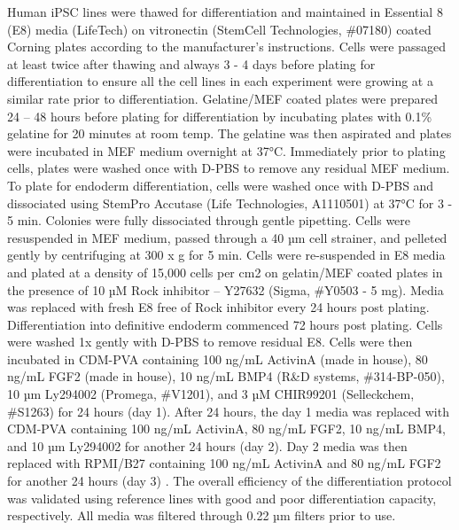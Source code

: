 Human iPSC lines were thawed for differentiation and maintained in Essential 8 (E8) media (LifeTech) on vitronectin (StemCell Technologies, \#07180) coated Corning plates according to the manufacturer's instructions.  
Cells were passaged at least twice after thawing and always 3 - 4 days before plating for differentiation to ensure all the cell lines in each experiment were growing at a similar rate prior to differentiation. 
Gelatine/MEF coated plates were prepared 24 – 48 hours before plating for differentiation by incubating plates with 0.1\% gelatine for 20 minutes at room temp. 
The gelatine was then aspirated and plates were incubated in MEF medium overnight at 37°C.  
Immediately prior to plating cells, plates were washed once with D-PBS to remove any residual MEF medium.  
To plate for endoderm differentiation, cells were washed once with D-PBS and dissociated using StemPro Accutase (Life Technologies, A1110501) at 37°C for 3 - 5 min. 
Colonies were fully dissociated through gentle pipetting. 
Cells were resuspended in MEF medium, passed through a 40 µm cell strainer, and pelleted gently by centrifuging at 300 x g for 5 min. Cells were re-suspended in E8 media and plated at a density of 15,000 cells per cm2  on gelatin/MEF coated plates \cite{hannan2013production, yiangou2018human} in the presence of 10 µM Rock inhibitor – Y27632 (Sigma, \#Y0503 - 5 mg). 
Media was replaced with fresh E8 free of Rock inhibitor every 24 hours post plating. 
Differentiation into definitive endoderm commenced 72 hours post plating.  
Cells were washed 1x gently with D-PBS to remove residual E8.  
Cells were then incubated in CDM-PVA containing 100 ng/mL ActivinA (made in house), 80 ng/mL FGF2 (made in house), 10 ng/mL BMP4 (R\&D systems, \#314-BP-050), 10 µm Ly294002 (Promega, \#V1201), and 3 µM CHIR99201 (Selleckchem, \#S1263) for 24 hours (day 1).  
After 24 hours, the day 1 media was replaced with CDM-PVA containing 100 ng/mL ActivinA, 80 ng/mL FGF2, 10 ng/mL BMP4, and 10 µm Ly294002 for another 24 hours (day 2).  
Day 2 media was then replaced with RPMI/B27 containing 100 ng/mL ActivinA and 80 ng/mL FGF2 for another 24 hours (day 3) \cite{hannan2013production}. 
The overall efficiency of the differentiation protocol was validated using reference lines with good and poor differentiation capacity, respectively.  
All media was filtered through 0.22 µm filters prior to use.

